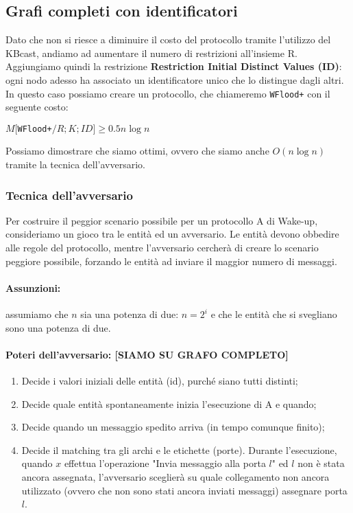 \subsection{Grafi completi con identificatori}
Dato che non si riesce a diminuire il costo del protocollo tramite l'utilizzo
del KBcast, andiamo ad aumentare il numero di restrizioni all'insieme R.
Aggiungiamo quindi la restrizione \textbf{Restriction Initial Distinct Values
    (ID)}: ogni nodo adesso ha associato un identificatore unico che lo distingue
dagli altri. In questo caso possiamo creare un protocollo, che chiameremo
\texttt{WFlood+} con il seguente costo:

\begin{theorem}
    $M[$\texttt{WFlood+}$/R;K;ID] \geq 0.5n \log n$
\end{theorem}

Possiamo dimostrare che siamo ottimi, ovvero che siamo anche $O(n \log n)$
tramite la tecnica dell'avversario.

\subsubsection{Tecnica dell'avversario}
Per costruire il peggior scenario possibile per un protocollo A di Wake-up,
consideriamo un gioco tra le entità ed un avversario. Le entità devono obbedire
alle regole del protocollo, mentre l'avversario cercherà di creare lo scenario
peggiore possibile, forzando le entità ad inviare il maggior numero di messaggi.

\paragraph{Assunzioni:} assumiamo che $n$ sia una potenza di due: $n = 2^i$ e che
le entità che si svegliano sono una potenza di due.

\paragraph{Poteri dell'avversario: [SIAMO SU GRAFO COMPLETO]}
\begin{enumerate}
    \item Decide i valori iniziali delle entità (id), purché siano tutti distinti;
    \item Decide quale entità spontaneamente inizia l'esecuzione di A e quando;
    \item Decide quando un messaggio spedito arriva (in tempo comunque finito);
    \item Decide il matching tra gli archi e le etichette (porte). Durante
          l'esecuzione, quando $x$ effettua l'operazione "Invia messaggio alla porta
          $l$" ed $l$ non è stata ancora assegnata, l'avversario sceglierà su quale
          collegamento non ancora utilizzato (ovvero che non sono stati ancora inviati
          messaggi) assegnare porta $l$.
\end{enumerate}

